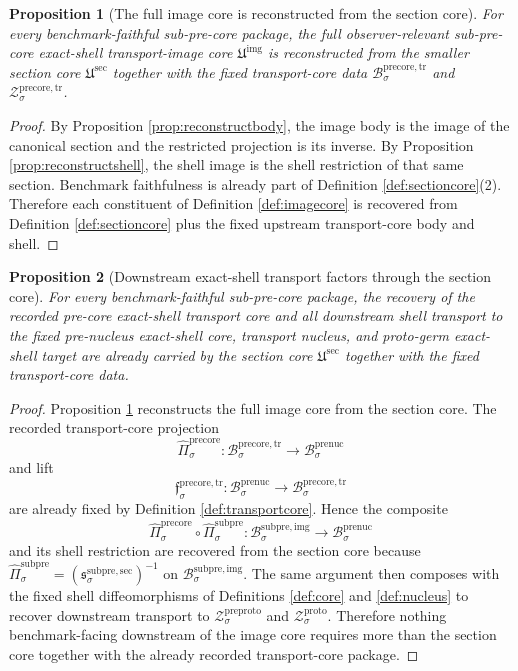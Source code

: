 \documentclass[11pt]{article}
\newcommand{\ProtoShellSet}[1]{\mathcal Z_{#1}^{\mathrm{proto}}}
\newcommand{\PreProtoShellSet}[1]{\mathcal Z_{#1}^{\mathrm{preproto}}}
\newcommand{\PreNucBody}[1]{\mathcal B_{#1}^{\mathrm{prenuc}}}
\newcommand{\PreCoreTrBody}[1]{\mathcal B_{#1}^{\mathrm{precore,tr}}}
\newcommand{\PreCoreTrProj}[1]{\widehat{\Pi}_{#1}^{\mathrm{precore}}}
\newcommand{\PreCoreTrLift}[1]{\mathfrak f_{#1}^{\mathrm{precore,tr}}}
\newcommand{\PreCoreTrShell}[1]{\mathcal Z_{#1}^{\mathrm{precore,tr}}}
\newcommand{\SubPreImageCore}{\mathfrak U^{\mathrm{img}}}
\newcommand{\SubPreImgBody}[1]{\mathcal B_{#1}^{\mathrm{subpre,img}}}
\newcommand{\SubPreImgProj}[1]{\widehat{\Pi}_{#1}^{\mathrm{subpre}}}
\newcommand{\SubPreSectionCore}{\mathfrak U^{\mathrm{sec}}}
\newcommand{\SubPreSection}[1]{\mathfrak s_{#1}^{\mathrm{subpre,sec}}}
\newtheorem{proposition}{Proposition}
\begin{document}
\begin{proposition}[The full image core is reconstructed from the section core]
\label{prop:reconstructimage}
For every benchmark-faithful sub-pre-core package, the full observer-relevant sub-pre-core exact-shell transport-image core \(\SubPreImageCore\) is reconstructed from the smaller section core \(\SubPreSectionCore\) together with the fixed transport-core data \(\PreCoreTrBody{\sigma}\) and \(\PreCoreTrShell{\sigma}\).
\end{proposition}

\begin{proof}
By Proposition \ref{prop:reconstructbody}, the image body is the image of the canonical section and the restricted projection is its inverse. By Proposition \ref{prop:reconstructshell}, the shell image is the shell restriction of that same section. Benchmark faithfulness is already part of Definition \ref{def:sectioncore}(2). Therefore each constituent of Definition \ref{def:imagecore} is recovered from Definition \ref{def:sectioncore} plus the fixed upstream transport-core body and shell.
\end{proof}

\begin{proposition}[Downstream exact-shell transport factors through the section core]
\label{prop:downstream}
For every benchmark-faithful sub-pre-core package, the recovery of the recorded pre-core exact-shell transport core and all downstream shell transport to the fixed pre-nucleus exact-shell core, transport nucleus, and proto-germ exact-shell target are already carried by the section core \(\SubPreSectionCore\) together with the fixed transport-core data.
\end{proposition}

\begin{proof}
Proposition \ref{prop:reconstructimage} reconstructs the full image core from the section core. The recorded transport-core projection
\[
\PreCoreTrProj{\sigma}:\PreCoreTrBody{\sigma}\to\PreNucBody{\sigma}
\]
and lift
\[
\PreCoreTrLift{\sigma}:\PreNucBody{\sigma}\to\PreCoreTrBody{\sigma}
\]
are already fixed by Definition \ref{def:transportcore}. Hence the composite
\[
\PreCoreTrProj{\sigma}\circ\SubPreImgProj{\sigma}
:
\SubPreImgBody{\sigma}\to\PreNucBody{\sigma}
\]
and its shell restriction are recovered from the section core because \(\SubPreImgProj{\sigma}=(\SubPreSection{\sigma})^{-1}\) on \(\SubPreImgBody{\sigma}\). The same argument then composes with the fixed shell diffeomorphisms of Definitions \ref{def:core} and \ref{def:nucleus} to recover downstream transport to \(\PreProtoShellSet{\sigma}\) and \(\ProtoShellSet{\sigma}\). Therefore nothing benchmark-facing downstream of the image core requires more than the section core together with the already recorded transport-core package.
\end{proof}
\end{document}
